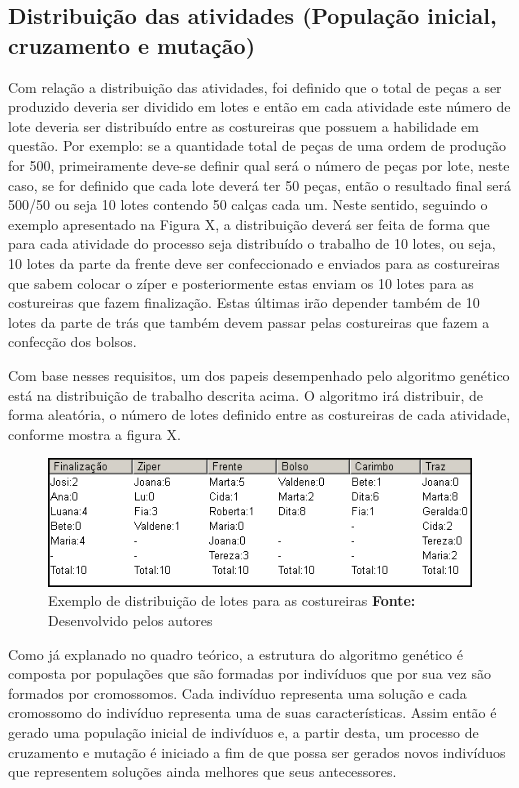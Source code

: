 \subsection{Distribuição das atividades (População inicial, cruzamento e mutação)}
\par Com relação a distribuição das atividades, foi definido que o total de peças a ser produzido deveria ser
dividido em lotes e então em cada atividade este número de lote deveria ser distribuído entre as costureiras que
possuem a habilidade em questão. Por exemplo: se a quantidade total de peças de uma ordem de produção for 500,
primeiramente deve-se definir qual será o número de peças por lote, neste caso, se for definido que cada lote  
deverá ter 50 peças, então o resultado final será 500/50 ou seja 10 lotes contendo 50 calças cada um. Neste sentido, seguindo
o exemplo apresentado  na Figura X, a distribuição deverá ser feita de forma que para cada atividade do processo seja distribuído
o trabalho de 10 lotes, ou seja, 10 lotes da parte da frente deve ser confeccionado e enviados para as costureiras que sabem colocar
o zíper e posteriormente estas enviam os 10 lotes para as costureiras que fazem finalização. Estas últimas irão depender
também de 10 lotes da parte de trás que também devem passar pelas costureiras que fazem a confecção dos bolsos. 


\par Com base nesses requisitos, um dos papeis desempenhado pelo algoritmo genético está na distribuição de
trabalho descrita acima. O algoritmo irá distribuir, de forma aleatória, o número de lotes definido entre as costureiras
de cada atividade, conforme mostra a figura X. 

\begin{figure}[h!]
	\centerline{\includegraphics[scale=1.0]{./imagens/distribuicao_exemplo.png}}
	\caption[Distribuição de trabalho]
	{Exemplo de distribuição de lotes para as costureiras \textbf{Fonte:} Desenvolvido pelos autores}
	\label{fig:exemplo1}
\end{figure}

\par Como já explanado no quadro teórico, a estrutura do algoritmo genético é composta
por populações que são formadas por indivíduos que por sua vez são formados por cromossomos.
Cada indivíduo representa uma solução e cada cromossomo do indivíduo representa uma de suas características. 
Assim então é gerado uma população inicial de indivíduos e, a partir desta, um processo de cruzamento 
e mutação é iniciado a fim de que possa ser gerados novos indivíduos que representem soluções ainda melhores 
que seus antecessores.

